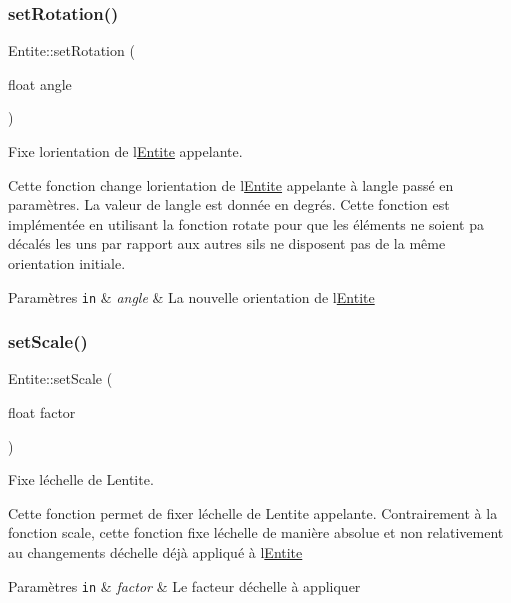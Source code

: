 \subsubsection{\texorpdfstring{set\+Rotation()}{setRotation()}}
{\footnotesize\ttfamily Entite\+::set\+Rotation (\begin{DoxyParamCaption}\item[{float}]{angle }\end{DoxyParamCaption})}



Fixe l\textquotesingle{}orientation de l\textquotesingle{}\hyperlink{class_entite}{Entite} appelante. 

Cette fonction change l\textquotesingle{}orientation de l\textquotesingle{}\hyperlink{class_entite}{Entite} appelante à l\textquotesingle{}angle passé en paramètres. La valeur de l\textquotesingle{}angle est donnée en degrés. Cette fonction est implémentée en utilisant la fonction rotate pour que les éléments ne soient pa décalés les uns par rapport aux autres s\textquotesingle{}ils ne disposent pas de la même orientation initiale. 
\begin{DoxyParams}[1]{Paramètres}
\mbox{\tt in}  & {\em angle} & La nouvelle orientation de l\textquotesingle{}\hyperlink{class_entite}{Entite} \\
\hline
\end{DoxyParams}
\mbox{\label{class_entite_a665939253829baba965ce3ead0f1739c}} 
\subsubsection{\texorpdfstring{set\+Scale()}{setScale()}}
{\footnotesize\ttfamily Entite\+::set\+Scale (\begin{DoxyParamCaption}\item[{float}]{factor }\end{DoxyParamCaption})}



Fixe l\textquotesingle{}échelle de L\textquotesingle{}entite. 

Cette fonction permet de fixer l\textquotesingle{}échelle de L\textquotesingle{}entite appelante. Contrairement à la fonction scale, cette fonction fixe l\textquotesingle{}échelle de manière absolue et non relativement au changements d\textquotesingle{}échelle déjà appliqué à l\textquotesingle{}\hyperlink{class_entite}{Entite} 
\begin{DoxyParams}[1]{Paramètres}
\mbox{\tt in}  & {\em factor} & Le facteur d\textquotesingle{}échelle à appliquer \\
\hline
\end{DoxyParams}


